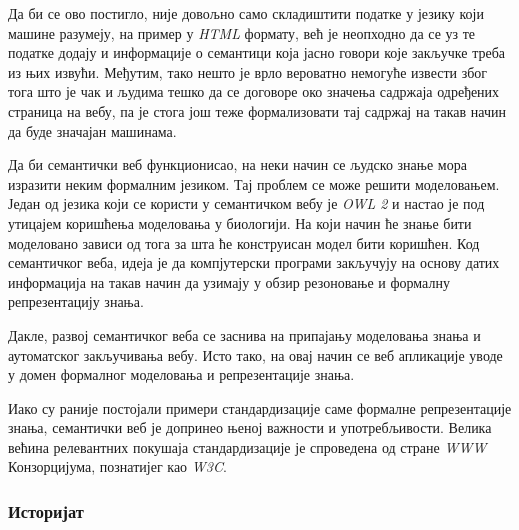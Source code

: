 \documentclass[12pt,oneside]{memoir}
\begin{document}
Да би се ово постигло, није довољно само складиштити податке у језику који машине разумеју, на пример у \textit{HTML} формату, већ је неопходно да се уз те податке додају и информације о семантици која јасно говори које закључке треба из њих извући. Међутим, тако нешто је врло вероватно немогуће извести због тога што је чак и људима тешко да се договоре око значења садржаја одређених страница на вебу, па је стога још теже формализовати тај садржај на такав начин да буде значајан машинама. \cite{semantic}


Да би семантички веб функционисао, на неки начин се људско знање мора изразити неким формалним језиком. Тај проблем се може решити моделовањем. Један од језика који се користи у семантичком вебу је \textit{OWL 2} и настао је под утицајем коришћења моделовања у биологији. На који начин ће знање бити моделовано зависи од тога за шта ће конструисан модел бити коришћен. Код семантичког веба, идеја је да компјутерски програми закључују на основу датих информација на такав начин да узимају у обзир резоновање и формалну репрезентацију знања. \cite{semantic}

Дакле, развој семантичког веба се заснива на припајању моделовања знања и аутоматског закључивања вебу. Исто тако, на овај начин се веб апликације уводе у домен формалног моделовања и репрезентације знања. 

Иако су раније постојали примери стандардизације саме формалне репрезентације знања, семантички веб је допринео њеној важности и употребљивости. Велика већина релевантних покушаја стандардизације је спроведена од стране \textit{WWW} Конзорцијума, познатијег као \textit{W3C}. \cite{semantic}


\subsubsection{Историјат}
\label{subsubsec:semantic_timeline}
\end{document}
